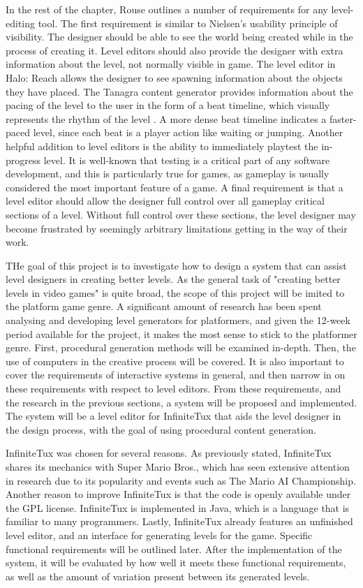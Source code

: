 In the rest of the chapter, Rouse outlines a number of requirements for any level-editing tool.
The first requirement is similar to Nielsen's usability principle of visibility. The designer
should be able to see the world being created while in the process of creating it. Level
editors should also provide the designer with extra information about the level, not
normally visible in game. The level editor in Halo: Reach allows the designer to see spawning
information about the objects they have placed. The Tanagra content generator provides
information about the pacing of the level to the user in the form of a beat timeline, which
visually represents the rhythm of the level \cite{smith2010}. A more dense beat timeline 
indicates a faster-paced level, since each beat is a player action like waiting or jumping.
Another helpful addition to level editors is the ability to immediately playtest the 
in-progress level. It is well-known that testing is a critical part of any software 
development, and this is particularly true for games, as gameplay is usually considered
the most important feature of a game. A final requirement is that a level editor should allow
the designer full control over all gameplay critical sections of a level. Without full control
over these sections, the level designer may become frustrated by seemingly arbitrary 
limitations getting in the way of their work.

THe goal of this project is to investigate how to design a system that can assist level
designers in creating better levels. As the general task of "creating better levels in video
games" is quite broad, the scope of this project will be imited to the platform game genre.
A significant amount of research has been spent analysing and developing level generators for
platformers, and given the 12-week period available for the project, it makes the most
sense to stick to the platformer genre. First, procedural generation methods will be examined
in-depth. Then, the use of computers in the creative process will be covered. It is also
important to cover the requirements of interactive systems in general, and then narrow in on
these requirements with respect to level editors. From these requirements, and the research
in the previous sections, a system will be proposed and implemented. The system will be a
level editor for InfiniteTux that aids the level designer in the design process, with the goal
of using procedural content generation. 

InfiniteTux was chosen for several reasons. As previously stated, InfiniteTux shares its
mechanics with Super Mario Bros., which has seen extensive attention in research due to
its popularity and events such as The Mario AI Championship. Another reason to improve
InfiniteTux is that the code is openly available under the GPL license. InfiniteTux is
implemented in Java, which is a language that is familiar to many programmers. Lastly, 
InfiniteTux already features an unfinished level editor, and an interface for generating
levels for the game. Specific functional requirements will be outlined later. After the
implementation of the system, it will be evaluated by how well it meets these functional 
requirements, as well as the amount of variation present between its generated levels.